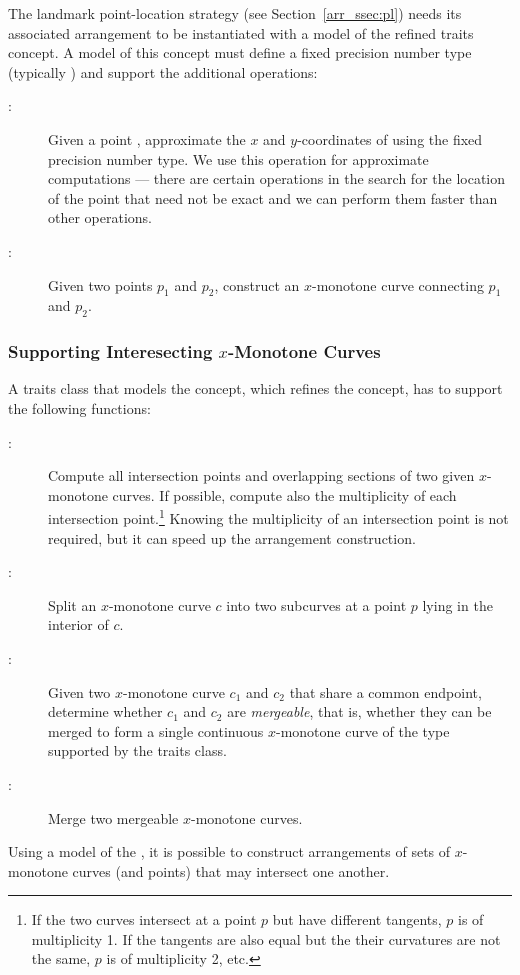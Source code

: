 The landmark point-location strategy (see
Section~\ref{arr_ssec:pl}) needs its associated arrangement to be
instantiated with a model of the refined
 traits concept. A model of this
concept must define a fixed precision number type (typically
) and support the additional operations:
\begin{description}
\item[:]
  Given a point , approximate the $x$ and $y$-coordinates
  of  using the fixed precision number type. We use this operation
  for approximate computations --- there are certain operations in the
  search for the location of the point that need not be exact and we can
  perform them faster than other operations.
%
\item[:] Given two points $p_1$ and
  $p_2$, construct an $x$-monotone curve connecting $p_1$ and $p_2$.
\end{description}

\subsubsection{Supporting Interesecting $x$-Monotone Curves
\label{arr_sssec:tr_xmon_concept}}

A traits class that models the 
concept, which refines the 
concept, has to support the following functions:
\begin{description}
\item[:]
  Compute all intersection points and overlapping sections of
  two given $x$-monotone curves. If possible, compute also the
  multiplicity of each intersection point.\footnote{If the two
    curves intersect at a point $p$ but have different tangents, $p$
    is of multiplicity 1. If the tangents are also equal but the their
    curvatures are not the same, $p$ is of multiplicity 2, etc.}
  Knowing the multiplicity of an intersection point is not required,
  but it can speed up the arrangement construction.
%
\item[:] Split an $x$-monotone curve $c$ into two subcurves
  at a point $p$ lying in the interior of $c$.
%
\item[:] Given two $x$-monotone curve $c_1$ and
  $c_2$ that share a common endpoint, determine whether $c_1$ and $c_2$
  are \emph{mergeable}, that is, whether they can be merged to form a
  single continuous $x$-monotone curve of the type supported by the
  traits class.
%
\item[:] Merge two mergeable $x$-monotone curves.
\end{description}
Using a model of the , it is
possible to construct arrangements of sets of $x$-monotone curves
(and points) that may intersect one another.

